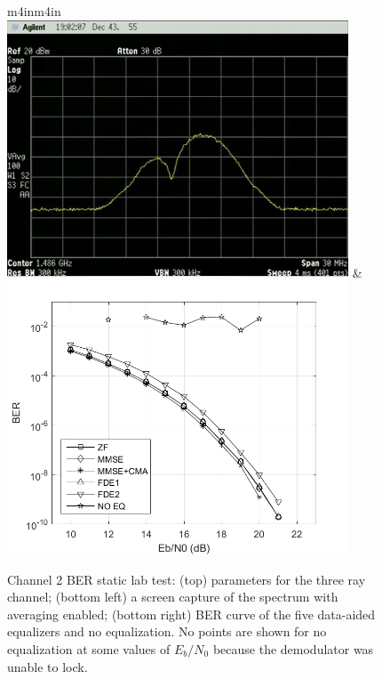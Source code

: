 \begin{figure}
\begin{center}
\begin{tabular}{m{4in}m{4in}}
\\[54pt]
\includegraphics[width=4in]{figures/eq_GPUimplementation/BER2.jpg}
&
\includegraphics[width=4in]{figures/myPNGs/BER2.png}
\end{tabular}
\end{center}
\caption{Channel 2 BER static lab test:
(top) parameters for the three ray channel;
(bottom left) a screen capture of the spectrum with averaging enabled;
(bottom right) BER curve of the five data-aided equalizers and no equalization.
No points are shown for no equalization at some values of $E_b/N_0$ because the demodulator was unable to lock.}
\label{fig:BER2}
\end{figure}

